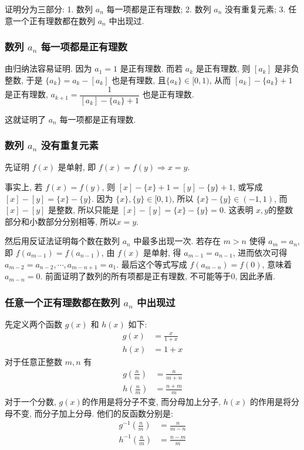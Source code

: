证明分为三部分: 1. 数列 $a_n$ 每一项都是正有理数; 2. 数列 $a_n$ 没有重复元素; 3. 任意一个正有理数都在数列 $a_n$ 中出现过.

\subsubsection{数列 $a_n$ 每一项都是正有理数}
由归纳法容易证明. 因为 $a_1 = 1$ 是正有理数. 而若 $a_k$ 是正有理数, 则 $[a_k]$ 是非负整数, 于是 $\{a_k\}= a_k - [a_k]$ 也是有理数, 且$\{a_k\} \in [0,1)$, 从而 $[a_k] - \{a_k\} + 1$ 是正有理数, $a_{k+1} = \dfrac{1}{[a_k] - \{a_k\} + 1}$ 也是正有理数.

这就证明了 $a_n$ 每一项都是正有理数.

\subsubsection{数列 $a_n$ 没有重复元素}
先证明 $f(x)$ 是单射, 即 $f(x) = f(y) \Rightarrow x = y$. 

事实上, 若 $f(x) = f(y)$, 则 $[x] - \{x\} + 1 = [y] - \{y\} + 1$, 或写成 $[x] - [y] = \{x\} - \{y\}$. 因为 $\{x\},\{y\}\in [0,1)$, 所以 $\{x\} - \{y\} \in (-1,1)$, 而 $[x] - [y]$ 是整数, 所以只能是 $[x] - [y] = \{x\} - \{y\} = 0$. 
这表明 $x,y$的整数部分和小数部分分别相等, 所以$x=y$.

然后用反证法证明每个数在数列 $a_n$ 中最多出现一次. 若存在 $ m > n$ 使得 $a_m = a_n$, 即 $f(a_{m-1}) = f(a_{n-1})$, 由 $f(x)$ 是单射, 得 $a_{m-1} = a_{n-1}$, 进而依次可得 $a_{m-2} = a_{n-2}, \cdots, a_{m-n+1} = a_1$. 最后这个等式写成 $f(a_{m-n}) = f(0)$, 意味着 $a_{m-n} = 0$. 前面证明了数列的所有项都是正有理数, 不可能等于0, 因此矛盾.

\subsubsection{任意一个正有理数都在数列 $a_n$ 中出现过}
先定义两个函数 $g(x)$ 和 $h(x)$ 如下:
\begin{align*}
g(x) &= \frac{x}{1+x} \\
h(x) &= 1+x
\end{align*}
对于任意正整数 $m,n$ 有
\begin{align*}
g(\frac{n}{m}) &= \frac{n}{m+n} \\
h(\frac{n}{m}) &= \frac{n+m}{m}
\end{align*}
对于一个分数, $g(x)$的作用是将分子不变, 而分母加上分子, $h(x)$ 的作用是将分母不变, 而分子加上分母. 他们的反函数分别是:
\begin{align*}
g^{-1}(\frac{n}{m}) &= \frac{n}{m-n} \\
h^{-1}(\frac{n}{m}) &= \frac{n-m}{m}
\end{align*}

